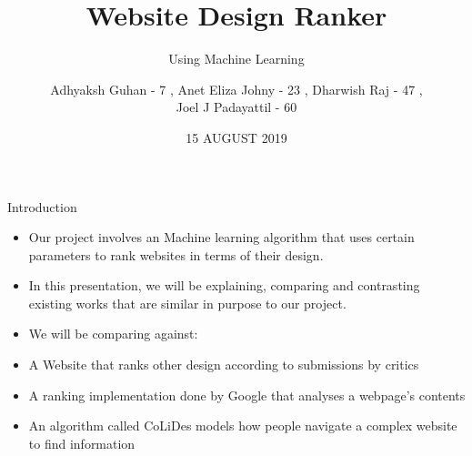 \documentclass[11pt]{beamer}
\begin{document}
	\title{\textbf{Website Design Ranker}}
	\subtitle{Using Machine Learning}
	\date{15 AUGUST 2019}
	\author{{\scriptsize Adhyaksh Guhan - 7 , Anet Eliza Johny - 23 , Dharwish Raj - 47 , \\ Joel J Padayattil - 60}}
	\begin{frame}[plain]
		\maketitle
	\end{frame}
	\begin{frame}{Introduction}
		\begin{itemize}
			\item Our project involves an Machine learning algorithm that uses certain parameters to rank websites in terms of their design.
			
			\item In this presentation, we will be explaining, comparing and contrasting existing works that are similar in purpose to our project.
		
			\item We will be comparing against:
				\item A Website that ranks other design according to submissions by critics
				\item A ranking implementation done by Google that analyses a webpage's contents
				\item An algorithm called CoLiDes models how people navigate a complex website to find information
		\end{itemize}
	\end{frame}
\end{document}
